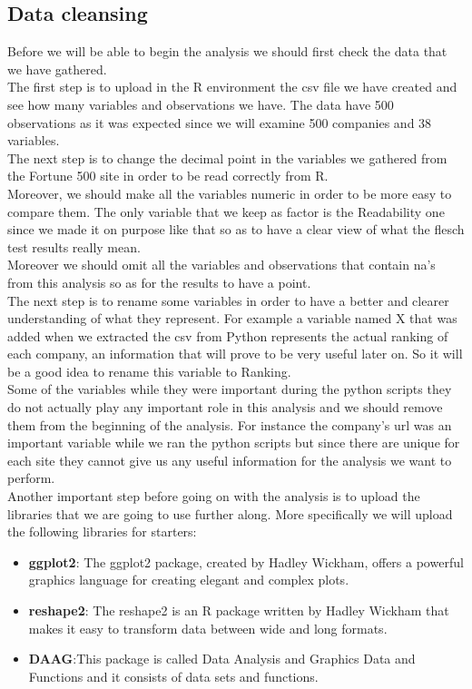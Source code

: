 \documentclass{book}
\begin{document}
\subsection{Data cleansing}
Before we will be able to begin the analysis we should first check the data that we have gathered.\\
The first step is to upload in the R environment the csv file we have created and see how many variables and observations we have. The data have 500 observations as it was expected since we will examine 500 companies and 38 variables.\\
The next step is to change the decimal point in the variables we gathered from the Fortune 500 site in order to be read correctly from R.\\
Moreover, we should make all the variables numeric in order to be more easy to compare them. The only variable that we keep as factor is the Readability one since we made it on purpose like that so as to have a clear view of what the flesch test results really mean.\\
Moreover we should omit all the variables and observations that contain na's from this analysis so as for the results to have a point.\\
The next step is to rename some variables in order to have a better and clearer understanding of what they represent. For example a variable named X that was added when we extracted the csv from Python represents the actual ranking of each company, an information that will prove to be very useful later on. So it will be a good idea to rename this variable to Ranking.\\
Some of the variables while they were important during the python scripts they do not actually play any important role in this analysis and we should remove them from the beginning of the analysis. For instance the company's url was an important variable while we ran the python scripts but since there are unique for each site they cannot give us any useful information for the analysis we want to perform.\\
Another important step before going on with the analysis is to upload the libraries that we are going to use further along. More specifically we will upload the following libraries for starters:
\begin{itemize}
\item \textbf{ggplot2}: The ggplot2 package, created by Hadley Wickham, offers a powerful graphics language for creating elegant and complex plots.
\item \textbf{reshape2}: The reshape2 is an R package written by Hadley Wickham that makes it easy to transform data between wide and long formats.
\item \textbf{DAAG}:This package is called Data Analysis and Graphics Data and Functions and it consists of data sets and functions.
\end{itemize}
\end{document}
